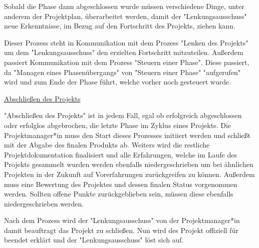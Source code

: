 Sobald die Phase dann abgeschlossen wurde müssen verschiedene Dinge, unter anderem der Projektplan, überarbeitet werden, damit der "Lenkungsausschuss" neue Erkenntnisse, im Bezug auf den Fortschritt des Projekts, ziehen kann.

Dieser Prozess steht in Kommunikation mit dem Prozess "Lenken des Projekts" um dem "Lenkungsausschuss" den erzielten Fortschritt mitzuteilen. Außerdem passiert Kommunikation mit dem Prozess "Steuern einer Phase". Diese passiert, da "Managen eines Phasenübergangs" von "Steuern einer Phase" "aufgerufen" wird und zum Ende der Phase führt, welche vorher noch gesteuert wurde. \cite{Prince2}

\underline{Abschließen des Projekts}

"Abschließen des Projekts" ist in jedem Fall, egal ob erfolgreich abgeschlossen oder erfolglos abgebrochen, die letzte Phase im Zyklus eines Projekts. Die Projektmanager*in muss den Start dieses Prozesses initiiert werden und schließt mit der Abgabe des finalen Produkts ab. Weiters wird die restliche Projektdokumentation finalisiert und alle Erfahrungen, welche im Laufe des Projekts gesammelt wurden werden ebenfalls niedergeschrieben um bei ähnlichen Projekten in der Zukunft auf Vorerfahrungen zurückgreifen zu können. Außerdem muss eine Bewertung des Projektes und dessen finalen Status vorgenommen werden. Sollten offene Punkte zurückgeblieben sein, müssen diese ebenfalls niedergeschrieben werden.

Nach dem Prozess wird der "Lenkungsausschuss" von der Projektmanager*in damit beauftragt das Projekt zu schließen. Nun wird des Projekt offiziell für beendet erklärt und der "Lenkungsausschuss" löst sich auf. \cite{Prince2}
